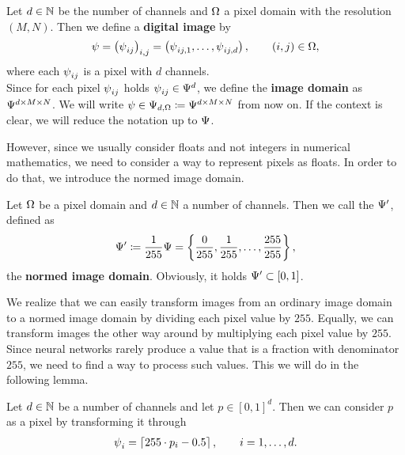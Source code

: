 \begin{definition}\label{def:image}
Let $d\in\N$ be the number of channels and $\O$ a pixel domain with the resolution $(M,N)$. Then we define a \textbf{digital image} by
\begin{align*}
\p=\left(\p_{ij}\right)_{i,j} = \left(\p_{ij,1},\ldots,\p_{ij,d} \right),\qquad (i,j)\in\O,
\end{align*}
where each $\p_{ij}$ is a pixel with $d$ channels.\\
Since for each pixel $\p_{ij}$ holds $\p_{ij}\in\P^d$, we define the \textbf{image domain} as $\P^{d\times M\times N}$. We will write $\p\in\P_{d,\O}\coloneqq \P^{d \times M\times N}$ from now on. If the context is clear, we will reduce the notation up to $\P$.
\end{definition}


However, since we usually consider floats and not integers in numerical mathematics, we need to consider a way to represent pixels as floats. In order to do that, we introduce the normed image domain.


\begin{definition}
Let $\O$ be a pixel domain and  $d\in\N$ a number of channels. Then we call the $\P^\prime$, defined as
\begin{align*}
\P^\prime \coloneqq \frac{1}{255} \P = \left\{\frac{0}{255}, \frac{1}{255}, \ldots, \frac{255}{255} \right\},
\end{align*}
the \textbf{normed image domain}. Obviously, it holds $\P^\prime \subset [0,1]$.
\end{definition}

We realize that we can easily transform images from an ordinary image domain to a normed image domain by dividing each pixel value by $255$. Equally, we can transform images the other way around by multiplying each pixel value by $255$.\\
Since neural networks rarely produce a value that is a fraction with denominator $255$, we need to find a way to process such values. This we will do in the following lemma.


\begin{lemma}
Let $d\in\N$ be a number of channels and let $p\in [0,1]^d$. Then we can consider $p$ as a pixel by transforming it through
\begin{align*}
\p_i = \left\lceil 255 \cdot p_i - 0.5 \right\rceil, \qquad i=1,\ldots,d.
\end{align*}
\end{lemma}

